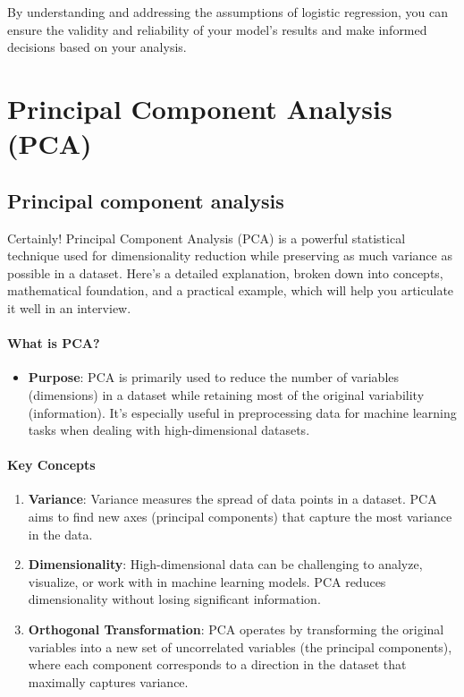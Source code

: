 \documentclass[12pt]{book}
\providecommand{\tightlist}{%
  \setlength{\itemsep}{0pt}\setlength{\parskip}{0pt}}
\begin{document}
By understanding and addressing the assumptions of logistic regression,
you can ensure the validity and reliability of your model's results and
make informed decisions based on your analysis.

\chapter{Principal Component Analysis (PCA)}

\section{Principal component
analysis}\label{principal-component-analysis}

Certainly! Principal Component Analysis (PCA) is a powerful statistical
technique used for dimensionality reduction while preserving as much
variance as possible in a dataset. Here's a detailed explanation, broken
down into concepts, mathematical foundation, and a practical example,
which will help you articulate it well in an interview.

\subsubsection{What is PCA?}\label{what-is-pca}

\begin{itemize}
\tightlist
\item
  \textbf{Purpose}: PCA is primarily used to reduce the number of
  variables (dimensions) in a dataset while retaining most of the
  original variability (information). It's especially useful in
  preprocessing data for machine learning tasks when dealing with
  high-dimensional datasets.
\end{itemize}

\subsubsection{Key Concepts}

\begin{enumerate}
\def\labelenumi{\arabic{enumi}.}
\item
  \textbf{Variance}: Variance measures the spread of data points in a
  dataset. PCA aims to find new axes (principal components) that capture
  the most variance in the data.
\item
  \textbf{Dimensionality}: High-dimensional data can be challenging to
  analyze, visualize, or work with in machine learning models. PCA
  reduces dimensionality without losing significant information.
\item
  \textbf{Orthogonal Transformation}: PCA operates by transforming the
  original variables into a new set of uncorrelated variables (the
  principal components), where each component corresponds to a direction
  in the dataset that maximally captures variance.
\end{enumerate}
\end{document}

